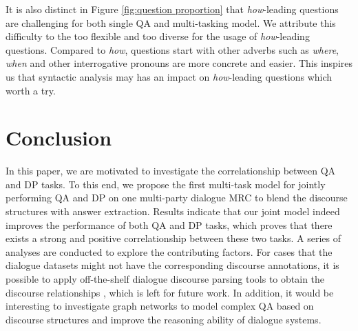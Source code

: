 \documentclass[11pt]{article}
\begin{document}
It is also distinct in Figure \ref{fig:question proportion} that \textit{how}-leading questions are challenging for both single QA and multi-tasking model. We attribute this difficulty to the too flexible and too diverse for the usage of \textit{how}-leading questions. Compared to \textit{how}, questions start with other adverbs such as \textit{where}, \textit{when} and other interrogative pronouns are more concrete and easier. This inspires us that syntactic analysis may has an impact on \textit{how}-leading questions which worth a try.

\section{Conclusion}\label{sec:conclusion}
In this paper, we are motivated to investigate the correlationship between QA and DP tasks. To this end, we propose the first multi-task model for jointly performing QA and DP on one multi-party dialogue MRC to blend the discourse structures with answer extraction. Results indicate that our joint model indeed improves the performance of both QA and DP tasks, which proves that there exists a strong and positive correlationship between these two tasks. A series of analyses are conducted to explore the contributing factors. For cases that the dialogue datasets might not have the corresponding discourse annotations, it is possible to apply off-the-shelf dialogue discourse parsing tools to obtain the discourse relationships  \cite{ouyang2020dialogue}, which is left for future work. In addition, it would be interesting to investigate graph networks to model complex QA based on discourse structures and improve the reasoning ability of dialogue systems.
\end{document}
